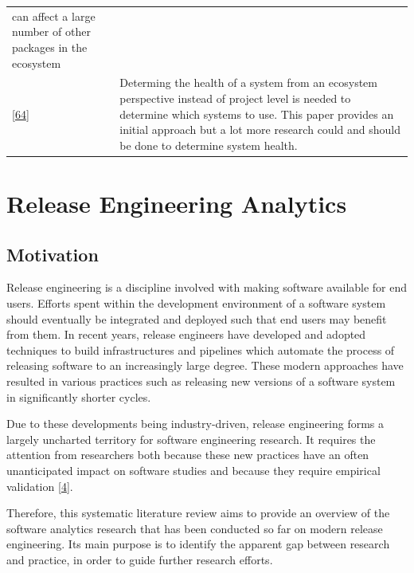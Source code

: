 \documentclass[]{book}
\begin{document}
\begin{longtable}[]{@{}ll@{}}
\begin{minipage}[t]{0.29\columnwidth}
can affect a large number of other packages in the ecosystem\strut
\end{minipage}\tabularnewline
\begin{minipage}[t]{0.13\columnwidth}\raggedright\strut
{[}\protect\hyperlink{ref-Jansen2014}{64}{]}\strut
\end{minipage} & \begin{minipage}[t]{0.29\columnwidth}\raggedright\strut
Determing the health of a system from an ecosystem perspective instead
of project level is needed to determine which systems to use. This paper
provides an initial approach but a lot more research could and should be
done to determine system health.\strut
\end{minipage}\tabularnewline
\bottomrule
\end{longtable}

\chapter{Release Engineering
Analytics}\label{release-engineering-analytics}

\section{Motivation}\label{motivation-4}

Release engineering is a discipline involved with making software
available for end users. Efforts spent within the development
environment of a software system should eventually be integrated and
deployed such that end users may benefit from them. In recent years,
release engineers have developed and adopted techniques to build
infrastructures and pipelines which automate the process of releasing
software to an increasingly large degree. These modern approaches have
resulted in various practices such as releasing new versions of a
software system in significantly shorter cycles.

Due to these developments being industry-driven, release engineering
forms a largely uncharted territory for software engineering research.
It requires the attention from researchers both because these new
practices have an often unanticipated impact on software studies and
because they require empirical validation
{[}\protect\hyperlink{ref-adams2016a}{4}{]}.

Therefore, this systematic literature review aims to provide an overview
of the software analytics research that has been conducted so far on
modern release engineering. Its main purpose is to identify the apparent
gap between research and practice, in order to guide further research
efforts.
\end{document}
